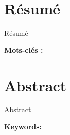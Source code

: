 \thispagestyle{empty}

\section*{Résumé}

Résumé

\textbf{Mots-clés : }


\section*{Abstract}

Abstract

\textbf{Keywords: }